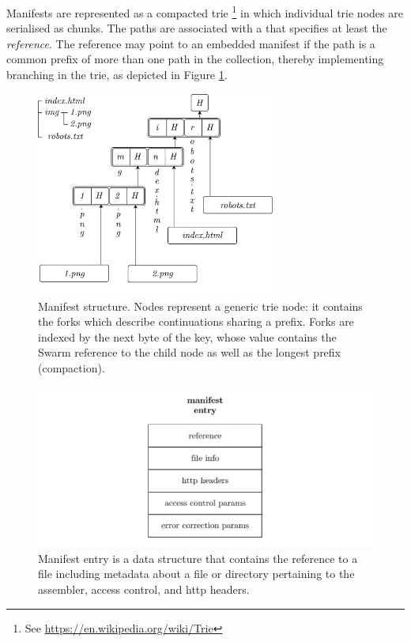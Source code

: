 Manifests are represented as a compacted trie%
%
\footnote{See \url{https://en.wikipedia.org/wiki/Trie}}
%
in which individual trie nodes are serialised as chunks. The paths are associated with a  that specifies at least the \emph{reference}. The reference may point to an embedded manifest if the path is a common prefix of more than one path in the collection, thereby implementing branching in the trie, as depicted in Figure \ref{fig:manifest-structure}. 


\begin{figure}[htbp]
\centering
\includegraphics[width=0.7\textwidth]{fig/manifest-structure.pdf}
\caption[Manifest structure \statusgreen]{Manifest structure. Nodes represent a generic trie node: it contains the forks which describe continuations sharing a prefix. Forks are indexed by the next byte of the key, whose value contains the Swarm reference to the child node as well as the longest prefix (compaction).}
\label{fig:manifest-structure}
\end{figure}

\begin{figure}[htbp]
\centering
\includegraphics[width=\textwidth]{fig/manifest-entry.pdf}
\caption[Manifest entry \statusgreen]{Manifest entry is a data  structure that contains the reference to a file including metadata about a file or directory  pertaining to the assembler, access control, and http headers.}
\label{fig:manifest-entry}
\end{figure}

